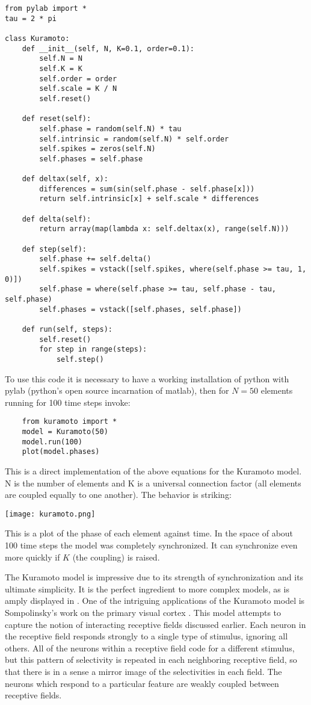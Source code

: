 \documentclass[12pt]{article}
\begin{document}
\begin{verbatim}
from pylab import *
tau = 2 * pi

class Kuramoto:
    def __init__(self, N, K=0.1, order=0.1):
        self.N = N
        self.K = K
        self.order = order
        self.scale = K / N
        self.reset()

    def reset(self):
        self.phase = random(self.N) * tau
        self.intrinsic = random(self.N) * self.order
        self.spikes = zeros(self.N)
        self.phases = self.phase

    def deltax(self, x):
        differences = sum(sin(self.phase - self.phase[x]))
        return self.intrinsic[x] + self.scale * differences

    def delta(self):
        return array(map(lambda x: self.deltax(x), range(self.N)))

    def step(self):
        self.phase += self.delta()
        self.spikes = vstack([self.spikes, where(self.phase >= tau, 1, 0)])
        self.phase = where(self.phase >= tau, self.phase - tau, self.phase)
        self.phases = vstack([self.phases, self.phase])

    def run(self, steps):
        self.reset()
        for step in range(steps):
            self.step()
\end{verbatim}

To use this code it is necessary to have a working installation of python with pylab (python's open source incarnation of matlab), then for $N=50$ elements running for 100 time steps invoke:

\begin{verbatim}
    from kuramoto import *
    model = Kuramoto(50)
    model.run(100)
    plot(model.phases)
\end{verbatim}

This is a direct implementation of the above equations for the Kuramoto model.  N is the number of elements and K is a universal connection factor (all elements are coupled equally to one another).  The behavior is striking:

\texttt{[image: kuramoto.png]}

This is a plot of the phase of each element against time.  In the space of about 100 time steps the model was completely synchronized.  It can synchronize even more quickly if $K$ (the coupling) is raised.  

The Kuramoto model is impressive due to its strength of synchronization and its ultimate simplicity.  It is the perfect ingredient to more complex models, as is amply displayed in \cite{Acebrón}.  One of the intriguing applications of the Kuramoto model is Sompolinsky's work on the primary visual cortex \cite{Sompolinsky}.  This model attempts to capture the notion of interacting receptive fields discussed earlier.  Each neuron in the receptive field responds strongly to a single type of stimulus, ignoring all others.  All of the neurons within a receptive field code for a different stimulus, but this pattern of selectivity is repeated in each neighboring receptive field, so that there is in a sense a mirror image of the selectivities in each field.  The neurons which respond to a particular feature are weakly coupled between receptive fields.  
\end{document}
